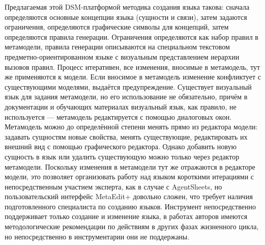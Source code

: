 Предлагаемая этой \ac{DSM}-платформой методика создания языка такова: сначала определяются 
основные концепции языка (сущности и связи), затем задаются ограничения, определяются 
графические символы для концепций, затем определяются правила генерации. Ограничения определяются
как набор правил в метамодели, правила генерации описываются на специальном текстовом 
предметно-ориентированном языке с визуальным представлением иерархии вызовов правил.
Процесс итеративен, все изменения, вносимые в метамодель, тут же применяются к модели. Если вносимое в метамодель 
изменение конфликтует с существующими моделями, выдаётся предупреждение. Существует визуальный 
язык для задания метамодели, но его использование не обязательно, причём в документации и 
обучающих материалах визуальный язык, как правило, не используется --- метамодель редактируется 
с помощью диалоговых окон. Метамодель можно до определённой степени менять прямо из редактора 
модели: задавать сущностям новые свойства, менять существующие, редактировать их внешний 
вид с помощью графического редактора. Однако добавить новую сущность в язык или удалить существующую можно только через 
редактор метамодели. Поскольку изменения в метамодели тут же отражаются в редакторе модели, 
это позволяет организовать работу над языком короткими итерациями с непосредственным 
участием эксперта, как в случае с AgentSheets, но пользовательский интерфейс MetaEdit+ 
довольно сложен, что требует наличия подготовленного специалиста по созданию языков. 
Инструмент непосредственно поддерживает только создание и изменение языка, в работах авторов 
имеются методологические рекомендации по действиям в других фазах жизненного цикла, но 
непосредственно в инструментарии они не поддержаны.


